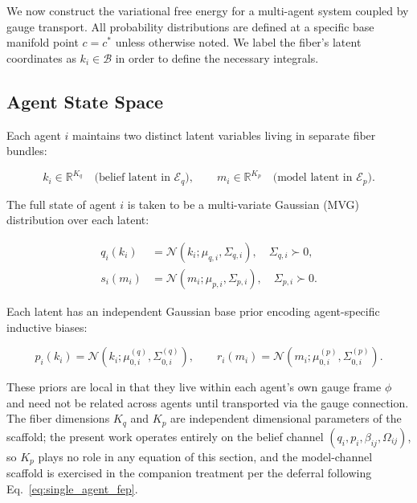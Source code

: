 \documentclass[twoside,11pt]{article}
\begin{document}
We now construct the variational free energy for a multi-agent system coupled by gauge transport. All probability distributions are defined at a specific base manifold point $c = c^*$ unless otherwise noted. We label the fiber's latent coordinates as $k_i \in \mathcal{B}$ in order to define the necessary integrals.

\subsection{Agent State Space}

Each agent $i$ maintains two distinct latent variables living in separate fiber bundles:

\begin{equation}
k_i \in \mathbb{R}^{K_q} \quad \text{(belief latent in $\mathcal{E}_q$)},
\qquad
m_i \in \mathbb{R}^{K_p} \quad \text{(model latent in $\mathcal{E}_p$)}.
\label{eq:dual_latents}
\end{equation}

The full state of agent $i$ is taken to be a multi-variate Gaussian (MVG) distribution over each latent:

\begin{equation}
\begin{aligned}
q_i(k_i) &= \mathcal{N}(k_i ;\mu_{q,i}, \Sigma_{q,i}),
\quad \Sigma_{q,i} \succ 0,\\
s_i(m_i) &= \mathcal{N}(m_i ;\mu_{p,i}, \Sigma_{p,i}),
\quad \Sigma_{p,i} \succ 0.
\end{aligned}
\label{eq:gaussian_states}
\end{equation}

Each latent has an independent Gaussian base prior encoding agent-specific inductive biases:

\begin{equation}
p_i(k_i) = \mathcal{N}(k_i ; \mu_{0,i}^{(q)}, \Sigma_{0,i}^{(q)}),
\qquad
r_i(m_i) = \mathcal{N}(m_i ; \mu_{0,i}^{(p)}, \Sigma_{0,i}^{(p)}).
\label{eq:base_priors}
\end{equation}

These priors are local in that they live within each agent's own gauge frame $\phi$ and need not be related across agents until transported via the gauge connection. The fiber dimensions $K_q$ and $K_p$ are independent dimensional parameters of the scaffold; the present work operates entirely on the belief channel $(q_i, p_i, \beta_{ij}, \Omega_{ij})$, so $K_p$ plays no role in any equation of this section, and the model-channel scaffold is exercised in the companion treatment per the deferral following Eq.~\eqref{eq:single_agent_fep}.
\end{document}
